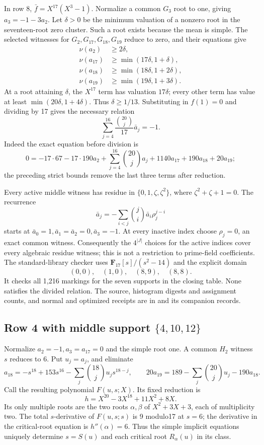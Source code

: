 \documentclass[
  british,
  10pt,
  a4paper,
]{article}
\begin{document}
In row 8, \(\bar f=X^{17}(X^3-1)\). Normalize a common \(G_3\) root to
one, giving \(a_3=-1-3a_2\). Let \(\delta>0\) be the minimum valuation
of a nonzero root in the seventeen-root zero cluster. Such a root exists
because the mean is simple. The selected witnesses for
\(G_2,G_{17},G_{18},G_{19}\) reduce to zero, and their equations give \[
\begin{aligned}
\nu(a_2)&\ge2\delta,\\
\nu(a_{17})&\ge\min(17\delta,1+\delta),\\
\nu(a_{18})&\ge\min(18\delta,1+2\delta),\\
\nu(a_{19})&\ge\min(19\delta,1+3\delta).
\end{aligned}
\] At a root attaining \(\delta\), the \(X^{17}\) term has valuation
\(17\delta\); every other term has value at least
\(\min(20\delta,1+4\delta)\). Thus \(\delta\ge1/13\). Substituting in
\(f(1)=0\) and dividing by 17 gives the necessary relation \[
 \sum_{j=4}^{16}\frac{\binom{20}{j}}{17}\bar a_j=-1.
\] Indeed the exact equation before division is \[
0=-17\cdot67-17\cdot190a_2+
\sum_{j=4}^{16}\binom{20}{j}a_j+1140a_{17}+190a_{18}+20a_{19};
\] the preceding strict bounds remove the last three terms after
reduction.

Every active middle witness has residue in \(\{0,1,\zeta,\zeta^2\}\),
where \(\zeta^2+\zeta+1=0\). The recurrence \[
\bar a_j=-\sum_{i<j}\binom ji\bar a_i\rho_j^{j-i}
\] starts at \(\bar a_0=1,\bar a_1=\bar a_2=0,\bar a_3=-1\). At every
inactive index choose \(\rho_j=0\), an exact common witness.
Consequently the \(4^{|J|}\) choices for the active indices cover every
algebraic residue witness; this is not a restriction to prime-field
coefficients. The standard-library checker uses
\(\mathbf F_{17}[s]/(s^2-14)\) and the explicit domain \[
(0,0),\quad(1,0),\quad(8,9),\quad(8,8).
\] It checks all 1,216 markings for the seven supports in the closing
table. None satisfies the divided relation. The source, histogram
digests and assignment counts, and normal and optimized receipts are in
 and its companion records.

\subsection{\texorpdfstring{Row 4 with middle support
\(\{4,10,12\}\)}{Row 4 with middle support \textbackslash\{4,10,12\textbackslash\}}}\label{row-4-with-middle-support-41012}

Normalize \(a_2=-1,a_3=a_{17}=0\) and the simple root one. A common
\(H_2\) witness \(s\) reduces to 6. Put \(u_j=a_j\), and eliminate \[
 a_{18}=-s^{18}+153s^{16}-\sum_j\binom{18}{j}u_js^{18-j},
\qquad
20a_{19}=189-\sum_j\binom{20}{j}u_j-190a_{18}.
\] Call the resulting polynomial \(F(u,s;X)\). Its fixed reduction is \[
h=X^{20}-3X^{18}+11X^2+8X.
\] Its only multiple roots are the two roots \(\alpha,\beta\) of
\(X^2+3X+3\), each of multiplicity two. The total \(s\)-derivative of
\(F(u,s;s)\) is 9 modulo17 at \(s=6\); the derivative in the
critical-root equation is \(h''(\alpha)=6\). Thus the simple implicit
equations uniquely determine \(s=S(u)\) and each critical root
\(R_\alpha(u)\) in its class.
\end{document}
